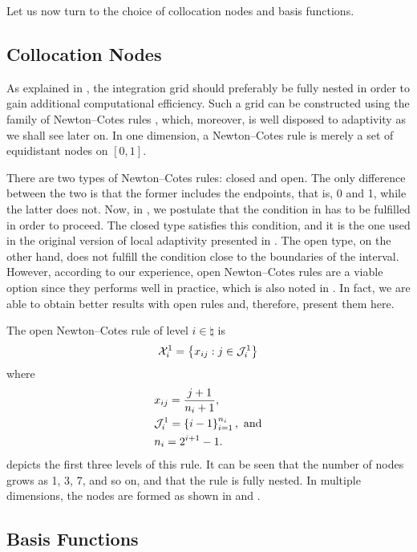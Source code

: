 Let us now turn to the choice of collocation nodes and basis functions.

\subsection{Collocation Nodes}

As explained in , the integration grid should
preferably be fully nested in order to gain additional computational efficiency.
Such a grid can be constructed using the family of Newton--Cotes rules
\cite{ma2009}, which, moreover, is well disposed to adaptivity as we shall see
later on. In one dimension, a Newton--Cotes rule is merely a set of equidistant
nodes on $[0, 1]$.

There are two types of Newton--Cotes rules: closed and open. The only difference
between the two is that the former includes the endpoints, that is, 0 and 1,
while the latter does not. Now, in , we postulate
that the condition in  has to be fulfilled in
order to proceed. The closed type satisfies this condition, and it is the one
used in the original version of local adaptivity presented in \cite{ma2009}. The
open type, on the other hand, does not fulfill the condition close to the
boundaries of the interval. However, according to our experience, open
Newton--Cotes rules are a viable option since they performs well in practice,
which is also noted in \cite{klimke2006}. In fact, we are able to obtain better
results with open rules and, therefore, present them here.

The open Newton--Cotes rule of level $i \in \natural$ is
\[
  \mathcal{X}^1_i = \left\{ x_{ij}: j \in \mathcal{J}^{1}_{i} \right\}
\]
where
\begin{align*}
  & x_{ij} = \frac{j + 1}{n_i + 1}, \\
  & \mathcal{J}^{1}_{i} = \left\{ i - 1 \right\}_{i = 1}^{n_i}, \text{ and} \\
  & n_i = 2^{i + 1} - 1.
\end{align*}
 depicts the first three levels of this rule. It can be
seen that the number of nodes grows as 1, 3, 7, and so on, and that the rule is
fully nested. In multiple dimensions, the nodes are formed as shown in
 and .

\subsection{Basis Functions}

